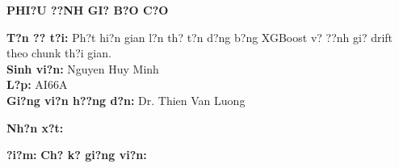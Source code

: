 \cleardoublepage
\thispagestyle{empty}
\begin{center}
    {\bfseries\LARGE PHI?U ??NH GI? B?O C?O}
\end{center}
\vspace{1cm}
\noindent\textbf{T?n ?? t?i:} Ph?t hi?n gian l?n th? t?n d?ng b?ng XGBoost v? ??nh gi? drift theo chunk th?i gian.\\[0.3cm]
\textbf{Sinh vi?n:} Nguyen Huy Minh\\[0.3cm]
\textbf{L?p:} AI66A\\[0.3cm]
\textbf{Gi?ng vi?n h??ng d?n:} Dr. Thien Van Luong

\vspace{1cm}
\noindent\textbf{Nh?n x?t:}

\vspace{5cm}
\noindent\textbf{?i?m:} \hfill \textbf{Ch? k? gi?ng vi?n:}\hspace{2cm}
\cleardoublepage
